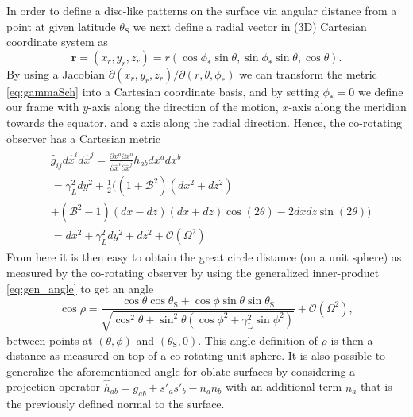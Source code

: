 \documentclass[iop, usenatbib]{emulateapj}
\newcommand{\be}{\begin{equation}}
\newcommand{\ee}{\end{equation}}
\renewcommand{\vec}[1]{\ensuremath{\boldsymbol{#1}}}
\newcommand{\lgamma}{\gamma_{\text{L}}}
\begin{document}
In order to define a disc-like patterns on the surface via angular
distance from a point at given latitude $\theta_{\mathrm{S}}$ we next
define a radial vector in (3D) Cartesian coordinate system as
\be
\vec{r} = (x_r, y_r, z_r) = r (\cos\phi_* \sin\theta, \sin\phi_* \sin\theta, \cos\theta).
\ee
By using a Jacobian $\partial(x_r, y_r, z_r)/\partial (r, \theta,
\phi_*)$ we can transform the metric \eqref{eq:gammaSch} into a
Cartesian coordinate basis, and by setting $\phi_*=0$ we define our frame
with $y$-axis along the direction of the motion, $x$-axis along the
meridian towards the equator, and $z$ axis along the radial direction.
Hence, the co-rotating observer has a Cartesian metric
\begin{align}\begin{split}
& \hat{g}_{ij} d\hat{x}^i d\hat{x}^j = \frac{\partial x^a \partial x^b}{\partial \hat{x}^i \partial \hat{x}^j} h_{ab} dx^a dx^b  \\
&= \gamma_L^2 dy^2 + \frac{1}{2} ( (1+\mathcal{B}^2)(dx^2 + dz^2) \\
&+ (\mathcal{B}^2 - 1)(dx-dz)(dx + dz) \cos(2\theta) - 2dx dz \sin(2\theta) ) \\
& = dx^2 + \gamma_L^2 dy^2 + dz^2 + \mathcal{O}(\Omega^2)
\end{split}\end{align}
From here it is then easy to obtain the great circle distance (on a unit
sphere) as measured by the co-rotating observer by using the generalized
inner-product \eqref{eq:gen_angle} to get an angle
\be\label{eq:rel_cos}
\cos\rho = \frac{\cos\theta \cos\theta_\mathrm{S} + \cos\phi \sin\theta \sin\theta_{\mathrm{S}}}{\sqrt{ \cos^2\theta + \sin^2\theta (\cos\phi^2 + \lgamma^2 \sin\phi^2)}} + \mathcal{O}(\Omega^2), 
\ee
between points at $(\theta, \phi)$ and $(\theta_{\mathrm{S}}, 0)$.
This angle definition of $\rho$ is then a distance as measured on top of
a co-rotating unit sphere.  It is also possible to generalize the
aforementioned angle for oblate surfaces by considering a projection
operator $\hat{h}_{ab} = g_{ab} + s'_a s'_b - n_a n_b$ with an
additional term $n_a$ that is the previously defined normal to the
surface.
\end{document}
